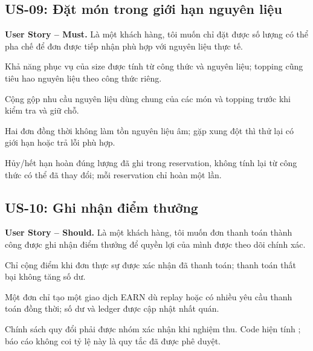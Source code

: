 \subsection{US-09: Đặt món trong giới hạn nguyên liệu}
\label{us:09}
\noindent\textbf{User Story -- Must.}
Là một khách hàng, tôi muốn chỉ đặt được số lượng có thể pha chế để đơn
được tiếp nhận phù hợp với nguyên liệu thực tế.
\begin{acceptance}
    \item Khả năng phục vụ của size được tính từ công thức và nguyên
    liệu; topping cũng tiêu hao nguyên liệu theo công thức riêng.
    \item Cộng gộp nhu cầu nguyên liệu dùng chung của các món và topping
    trước khi kiểm tra và giữ chỗ.
    \item Hai đơn đồng thời không làm tồn nguyên liệu âm; gặp xung đột
    thì thử lại có giới hạn hoặc trả lỗi phù hợp.
    \item Hủy/hết hạn hoàn đúng lượng đã ghi trong reservation, không
    tính lại từ công thức có thể đã thay đổi; mỗi reservation chỉ hoàn một lần.
\end{acceptance}

\subsection{US-10: Ghi nhận điểm thưởng}
\label{us:10}
\noindent\textbf{User Story -- Should.}
Là một khách hàng, tôi muốn đơn thanh toán thành công được ghi nhận điểm
thưởng để quyền lợi của mình được theo dõi chính xác.
\begin{acceptance}
    \item Chỉ cộng điểm khi đơn thực sự được xác nhận đã thanh toán;
    thanh toán thất bại không tăng số dư.
    \item Một đơn chỉ tạo một giao dịch EARN dù replay hoặc có nhiều
    yêu cầu thanh toán đồng thời; số dư và ledger được cập nhật nhất quán.
    \item Chính sách quy đổi phải được nhóm xác nhận khi nghiệm thu.
    Code hiện tính ; báo cáo không coi tỷ lệ này
    là quy tắc đã được phê duyệt.
\end{acceptance}

